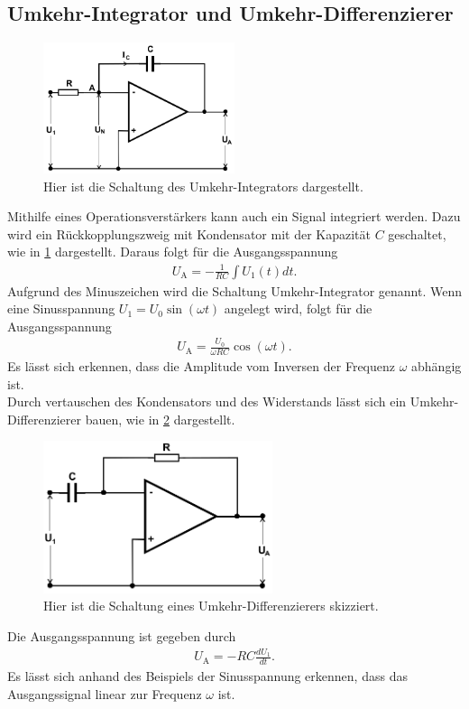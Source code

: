 \subsection{Umkehr-Integrator und Umkehr-Differenzierer}
\label{sec:Umkehr-Integrator}
\begin{figure}[h!]
	\centering
	\includegraphics[width=0.5\textwidth]{../Grafiken/Umkehr_Integrator.png}
	\caption{Hier ist die Schaltung des Umkehr-Integrators dargestellt. \cite{V51} \label{fig:Umkehr_Integrator}}
\end{figure}
\noindent
Mithilfe eines Operationsverstärkers kann auch ein Signal integriert werden.
Dazu wird ein Rückkopplungszweig mit Kondensator mit der Kapazität $C$ geschaltet, wie in \cref{fig:Umkehr_Integrator} dargestellt.
Daraus folgt für die Ausgangsspannung
\begin{align}
	U_\text{A}=-\frac{1}{RC}\int U_1(t)dt.
\end{align}
Aufgrund des Minuszeichen wird die Schaltung Umkehr-Integrator genannt.
Wenn eine Sinusspannung $U_1=U_0\sin(\omega t)$ angelegt wird, folgt für die Ausgangsspannung
\begin{align}
	U_\text{A}=\frac{U_0}{\omega RC}\cos(\omega t).
\end{align}
Es lässt sich erkennen, dass die Amplitude vom Inversen der Frequenz $\omega$ abhängig ist.\\\indent
Durch vertauschen des Kondensators und des Widerstands lässt sich ein Umkehr-Differenzierer bauen, wie in \cref{fig:Umkehr_Diff} dargestellt.
\begin{figure}[h!]
	\centering
	\includegraphics[width = 0.6\textwidth]{../Grafiken/Umkehr_Differentierer.png}
	\caption{Hier ist die Schaltung eines Umkehr-Differenzierers skizziert. \cite{V51}\label{fig:Umkehr_Diff}}
\end{figure}
Die Ausgangsspannung ist gegeben durch
\begin{align}
	U_\text{A}=-RC\frac{dU_1}{dt}.
\end{align}
Es lässt sich anhand des Beispiels der Sinusspannung erkennen, dass das Ausgangssignal linear zur Frequenz $\omega$ ist.
